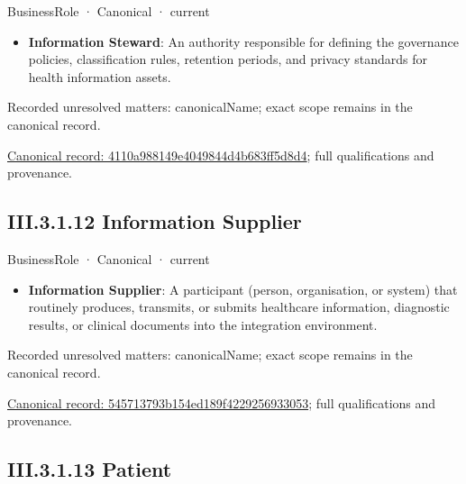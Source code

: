 \label{element:4110a988149e4049844d4b683ff5d8d4}
{\small BusinessRole · Canonical · current}\par

\begin{itemize}


\item \textbf{Information Steward}: An authority responsible for defining the governance policies, classification rules, retention periods, and privacy standards for health information assets.

\end{itemize}

{\small Recorded unresolved matters: canonicalName; exact scope remains in the canonical record.}\par
{\footnotesize \href{../../../../continuum/business/business-role/4110a988149e4049844d4b683ff5d8d4.md}{Canonical record: 4110a988149e4049844d4b683ff5d8d4}; full qualifications and provenance.}\par
\subsection*{III.3.1.12 Information Supplier}
\label{navigation:III.3.1.12}

\label{element:545713793b154ed189f4229256933053}
{\small BusinessRole · Canonical · current}\par

\begin{itemize}


\item \textbf{Information Supplier}: A participant (person, organisation, or system) that routinely produces, transmits, or submits healthcare information, diagnostic results, or clinical documents into the integration environment.

\end{itemize}

{\small Recorded unresolved matters: canonicalName; exact scope remains in the canonical record.}\par
{\footnotesize \href{../../../../continuum/business/business-role/545713793b154ed189f4229256933053.md}{Canonical record: 545713793b154ed189f4229256933053}; full qualifications and provenance.}\par
\subsection*{III.3.1.13 Patient}
\label{navigation:III.3.1.13}

